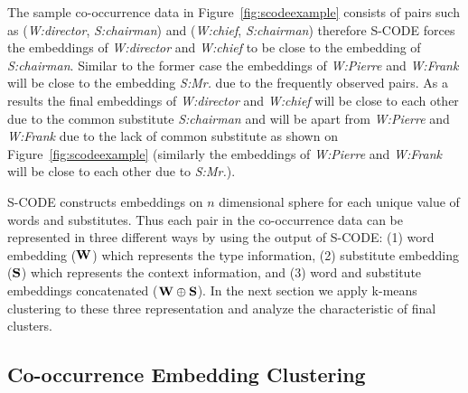 
The sample co-occurrence data in Figure~\ref{fig:scodeexample}
consists of pairs such as (\textit{W:director}, \textit{S:chairman})
and (\textit{W:chief}, \textit{S:chairman}) therefore S-CODE forces
the embeddings of \textit{W:director} and \textit{W:chief} to be close
to the embedding of \textit{S:chairman}.  Similar to the former case
the embeddings of \textit{W:Pierre} and \textit{W:Frank} will be close
to the embedding \textit{S:Mr.} due to the frequently observed pairs.
As a results the final embeddings of \textit{W:director} and
\textit{W:chief} will be close to each other due to the common
substitute \textit{S:chairman} and will be apart from
\textit{W:Pierre} and \textit{W:Frank} due to the lack of common
substitute as shown on Figure~\ref{fig:scodeexample} (similarly the
embeddings of \textit{W:Pierre} and \textit{W:Frank} will be close to
each other due to \textit{S:Mr.}).

S-CODE constructs embeddings on $n$ dimensional sphere for each unique
value of words and substitutes.  Thus each pair in the co-occurrence
data can be represented in three different ways by using the output of
S-CODE: (1) word embedding (${\bf W}$) which represents the type
information, (2) substitute embedding (${\bf S}$) which represents the
context information, and (3) word and substitute embeddings
concatenated (${\bf W}\oplus{\bf S}$).  In the next section we apply
k-means clustering to these three representation and analyze the
characteristic of final clusters.

\subsection{Co-occurrence Embedding Clustering}


